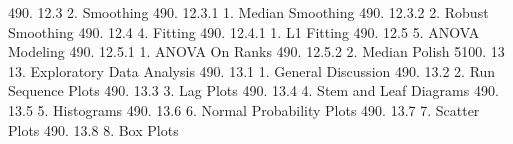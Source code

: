 490.      12.3                  2. Smoothing
490.      12.3.1                      1. Median Smoothing
490.      12.3.2                      2. Robust Smoothing
490.      12.4                  4. Fitting
490.      12.4.1                      1. L1 Fitting
490.      12.5                  5. ANOVA Modeling
490.      12.5.1                      1. ANOVA On Ranks
490.      12.5.2                      2. Median Polish
5100.     13             13. Exploratory Data Analysis
490.      13.1                  1. General Discussion
490.      13.2                  2. Run Sequence Plots
490.      13.3                  3. Lag Plots
490.      13.4                  4. Stem and Leaf Diagrams
490.      13.5                  5. Histograms
490.      13.6                  6. Normal Probability Plots
490.      13.7                  7. Scatter Plots
490.      13.8                  8. Box Plots
 
 
 
 
 
 
 
 
 
 
 
 
 
 
 
 
 
 
 
 
 
 
 
 
 
 
 
 
 
 
 
 
 
 
 
 
 
 
 
 
 
 
 
 
 
 
 
 
 
 
 
 
 
 
 
 
 
 
 
 
 
 
 
 
 
 
 
 
 
 
 
 
 
 
 
 
 
 
 
